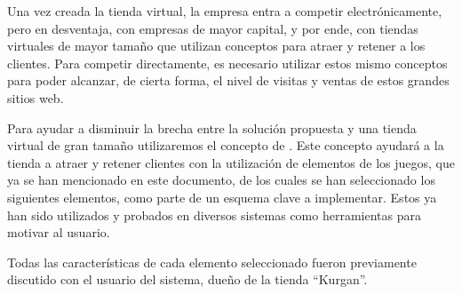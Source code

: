 Una vez creada la tienda virtual, la empresa entra a competir electrónicamente,
pero en desventaja, con empresas de mayor capital, y por ende, con tiendas virtuales
de mayor tamaño que utilizan conceptos para atraer y retener a los clientes.
Para competir directamente, es necesario utilizar estos mismo conceptos para
poder alcanzar, de cierta forma, el nivel de visitas y ventas de estos grandes
sitios web.

Para ayudar a disminuir la brecha entre la solución propuesta y una tienda virtual
de gran tamaño utilizaremos el concepto de {\gam}.
Este concepto ayudará a la tienda a atraer y retener clientes con la utilización
de elementos de los juegos, que ya se han mencionado en este documento,
de los cuales se han seleccionado los siguientes elementos, como parte
de un esquema clave a implementar. Estos ya han sido utilizados y probados en diversos
sistemas como herramientas para motivar al usuario\cite{SocialMotivation}.

Todas las características de cada elemento seleccionado fueron previamente discutido con el
usuario del sistema, dueño de la tienda ``Kurgan''. 

